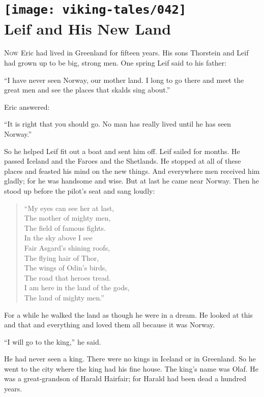\section[Leif and His New Land]{
    \texttt{[image: viking-tales/042]}\\
    Leif and His New Land}

\lettrine{N}{ow} Eric had lived in Greenland for fifteen years. His sons
Thorstein and Leif had grown up to be big, strong men. One spring Leif
said to his father:

``I have never seen Norway, our mother land. I long to go there and meet
the great men and see the places that skalds sing about.''

Eric answered:

``It is right that you should go. No man has really lived until he has
seen Norway.''

So he helped Leif fit out a boat and sent him off. Leif sailed for
months. He passed Iceland and the Faroes and the Shetlands. He stopped
at all of these places and feasted his mind on the new things. And
everywhere men received him gladly; for he was handsome and wise. But at
last he came near Norway. Then he stood up before the pilot's seat and
sang loudly:

\begin{quote}
``My eyes can see her at last,\\
The mother of mighty men,\\
The field of famous fights.\\
In the sky above I see\\
Fair Asgard's shining roofs,\\
The flying hair of Thor,\\
The wings of Odin's birds,\\
The road that heroes tread.\\
I am here in the land of the gods,\\
The land of mighty men.''
\end{quote}

For a while he walked the land as though he were in a dream. He looked
at this and that and everything and loved them all because it was
Norway.

``I will go to the king,'' he said.

He had never seen a king. There were no kings in Iceland or in
Greenland. So he went to the city where the king had his fine house. The
king's name was Olaf. He was a great-grandson of Harald Hairfair; for
Harald had been dead a hundred years.

